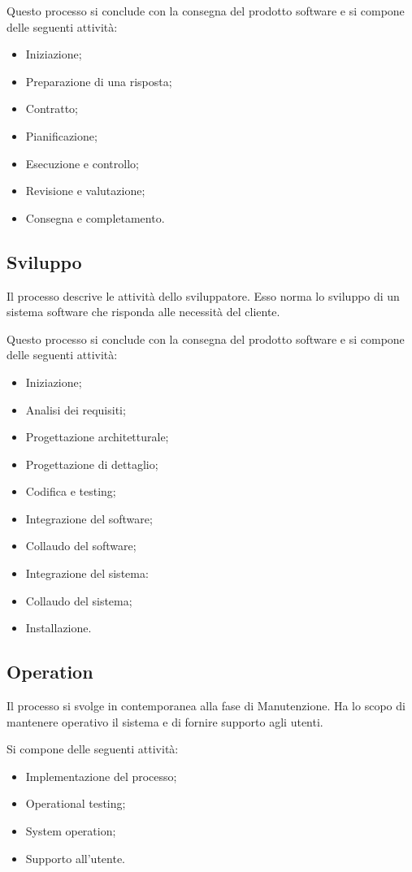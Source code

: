Questo processo si conclude con la consegna del prodotto software e si compone delle seguenti attività:

\begin{itemize}
    \item Iniziazione;
    \item Preparazione di una risposta;
    \item Contratto;
    \item Pianificazione;
    \item Esecuzione e controllo;
    \item Revisione e valutazione;
    \item Consegna e completamento.
\end{itemize}

\subsection{Sviluppo}

Il processo descrive le attività dello sviluppatore. Esso norma lo sviluppo di un sistema software che risponda alle necessità del cliente.

Questo processo si conclude con la consegna del prodotto software e si compone delle seguenti attività:

\begin{itemize}
    \item Iniziazione;
    \item Analisi dei requisiti;
    \item Progettazione architetturale;
    \item Progettazione di dettaglio;
    \item Codifica e testing;
    \item Integrazione del software;
    \item Collaudo del software;
    \item Integrazione del sistema:
    \item Collaudo del sistema;
    \item Installazione.
\end{itemize}

\subsection{Operation}
Il processo si svolge in contemporanea alla fase di Manutenzione. Ha lo scopo di mantenere operativo il sistema e di fornire supporto agli utenti.

Si compone delle seguenti attività:
\begin{itemize}
    \item Implementazione del processo;
    \item Operational testing;
    \item System operation;
    \item Supporto all'utente.
\end{itemize}

